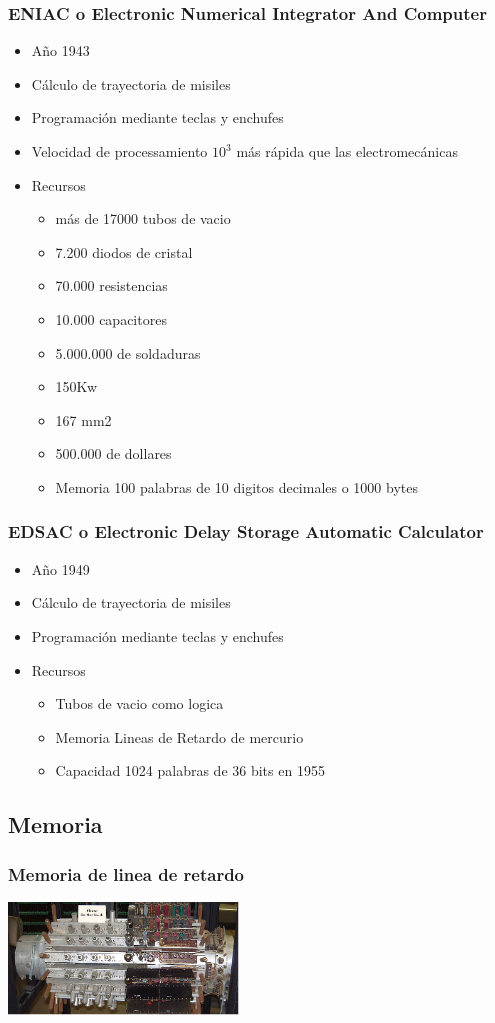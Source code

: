 \documentclass{beamer}
\begin{document}
\begin{frame}
\frametitle{ENIAC o Electronic Numerical Integrator And Computer}
\begin{itemize}
	\item Año 1943
	\item Cálculo de trayectoria de misiles
	\item Programación mediante teclas y enchufes
	\item Velocidad de processamiento $10^{3}$ más rápida que las electromecánicas
	\item Recursos
		\begin{itemize}
			\item más de 17000 tubos de vacio
			\item 7.200 diodos de cristal
			\item 70.000 resistencias
			\item 10.000 capacitores
			\item 5.000.000 de soldaduras
			\item 150Kw
			\item 167 mm2
			\item 500.000 de dollares
			\item Memoria 100 palabras de 10 digitos decimales o 1000 bytes
		\end{itemize}
\end{itemize}
\end{frame}

\begin{frame}
\frametitle{EDSAC o Electronic Delay Storage Automatic Calculator}
\begin{itemize}
	\item Año 1949
	\item Cálculo de trayectoria de misiles
	\item Programación mediante teclas y enchufes
	\item Recursos
		\begin{itemize}
			\item Tubos de vacio como logica
			\item Memoria Lineas de Retardo de mercurio
			\item Capacidad 1024 palabras de 36 bits en 1955
		\end{itemize}
\end{itemize}
\end{frame}

\subsection{Memoria}
\begin{frame}
\frametitle{Memoria de linea de retardo}
\includegraphics[height=3cm]{Mercury_memory.jpg}
\end{frame}
\end{document}
